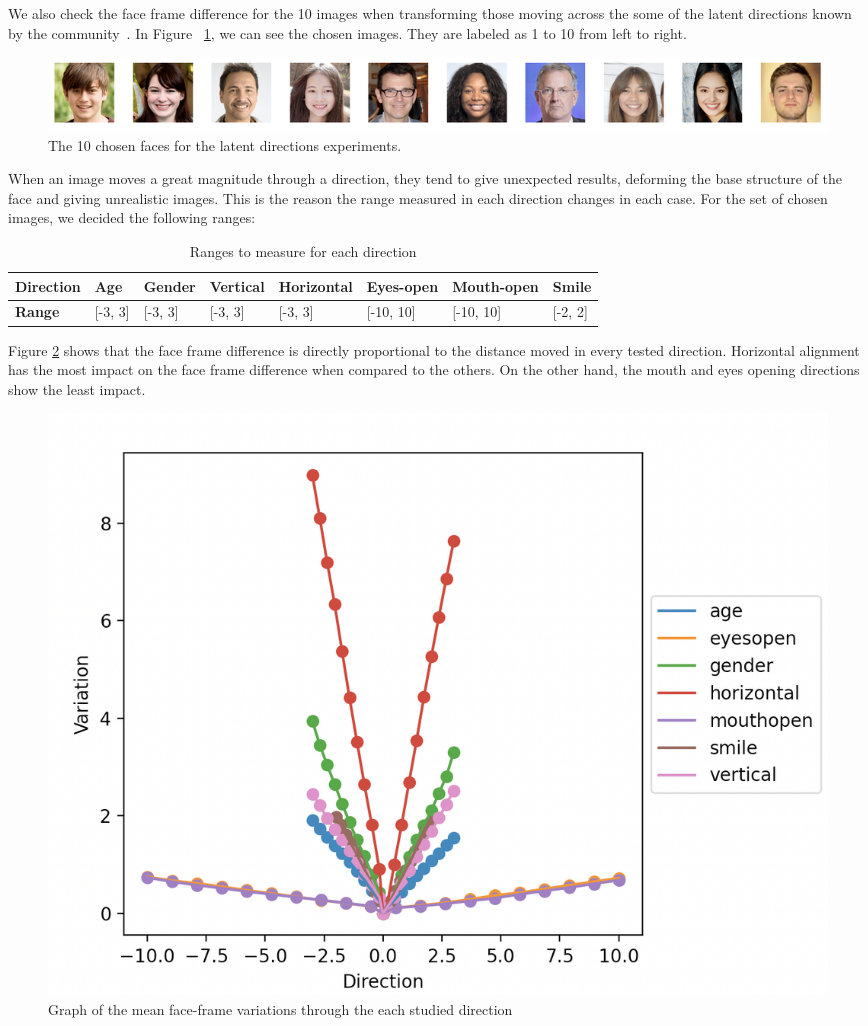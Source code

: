 \documentclass[review]{elsarticle}
\begin{document}
We also check the face frame difference for the 10 images when transforming those moving across the some of the latent directions known by the community~\citep{luxemburg}. In Figure ~\ref{fig:samples}, we can see the chosen images. They are labeled as 1 to 10 from left to right.

\begin{figure}[H]
  \includegraphics[width=\linewidth, center]{Images/sample_faces.png}
  \caption{The 10 chosen faces for the latent directions experiments.}
  \label{fig:samples}
\end{figure}

When an image moves a great magnitude through a direction, they tend to give unexpected results, deforming the base structure of the face and giving unrealistic images. This is the reason the range measured in each direction changes in each case. For the set of chosen images, we decided the following ranges:

\begin{table}[H]
\centering
\begin{tabular}{|l|l|l|l|l|l|l|l|}
\hline
\textbf{Direction} & Age & Gender & Vertical & Horizontal & Eyes-open & Mouth-open & Smile \\ \hline
\textbf{Range} & [-3, 3] & [-3, 3] & [-3, 3] & [-3, 3] & [-10, 10] & [-10, 10] & [-2, 2] \\ \hline
\end{tabular}
    \caption{Ranges to measure for each direction}
  \label{table:ranges}
\end{table}

Figure \ref{fig:graph_means} shows that the face frame difference is directly proportional to the distance moved in every tested direction. Horizontal alignment has the most impact on the face frame difference when compared to the others. On the other hand, the mouth and eyes opening directions show the least impact.

\begin{figure}[H]
  \includegraphics[width=0.8\linewidth, center]{Images/graph_means.png}
  \caption{Graph of the mean face-frame variations through the each studied direction}
  \label{fig:graph_means}
\end{figure} 
\end{document}
